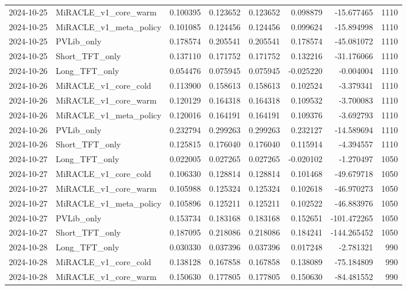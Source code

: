 \begin{tabular}{llrrrrrr}
2024-10-25 & MiRACLE_v1_core_warm & 0.100395 & 0.123652 & 0.123652 & 0.098879 & -15.677465 & 1110 \\
2024-10-25 & MiRACLE_v1_meta_policy & 0.101085 & 0.124456 & 0.124456 & 0.099624 & -15.894998 & 1110 \\
2024-10-25 & PVLib_only & 0.178574 & 0.205541 & 0.205541 & 0.178574 & -45.081072 & 1110 \\
2024-10-25 & Short_TFT_only & 0.137110 & 0.171752 & 0.171752 & 0.132216 & -31.176066 & 1110 \\
2024-10-26 & Long_TFT_only & 0.054476 & 0.075945 & 0.075945 & -0.025220 & -0.004004 & 1110 \\
2024-10-26 & MiRACLE_v1_core_cold & 0.113900 & 0.158613 & 0.158613 & 0.102524 & -3.379341 & 1110 \\
2024-10-26 & MiRACLE_v1_core_warm & 0.120129 & 0.164318 & 0.164318 & 0.109532 & -3.700083 & 1110 \\
2024-10-26 & MiRACLE_v1_meta_policy & 0.120016 & 0.164191 & 0.164191 & 0.109376 & -3.692793 & 1110 \\
2024-10-26 & PVLib_only & 0.232794 & 0.299263 & 0.299263 & 0.232127 & -14.589694 & 1110 \\
2024-10-26 & Short_TFT_only & 0.125815 & 0.176040 & 0.176040 & 0.115914 & -4.394557 & 1110 \\
2024-10-27 & Long_TFT_only & 0.022005 & 0.027265 & 0.027265 & -0.020102 & -1.270497 & 1050 \\
2024-10-27 & MiRACLE_v1_core_cold & 0.106330 & 0.128814 & 0.128814 & 0.101468 & -49.679718 & 1050 \\
2024-10-27 & MiRACLE_v1_core_warm & 0.105988 & 0.125324 & 0.125324 & 0.102618 & -46.970273 & 1050 \\
2024-10-27 & MiRACLE_v1_meta_policy & 0.105896 & 0.125211 & 0.125211 & 0.102522 & -46.883976 & 1050 \\
2024-10-27 & PVLib_only & 0.153734 & 0.183168 & 0.183168 & 0.152651 & -101.472265 & 1050 \\
2024-10-27 & Short_TFT_only & 0.187095 & 0.218086 & 0.218086 & 0.184241 & -144.265452 & 1050 \\
2024-10-28 & Long_TFT_only & 0.030330 & 0.037396 & 0.037396 & 0.017248 & -2.781321 & 990 \\
2024-10-28 & MiRACLE_v1_core_cold & 0.138128 & 0.167858 & 0.167858 & 0.138089 & -75.184809 & 990 \\
2024-10-28 & MiRACLE_v1_core_warm & 0.150630 & 0.177805 & 0.177805 & 0.150630 & -84.481552 & 990 \\

\end{tabular}
